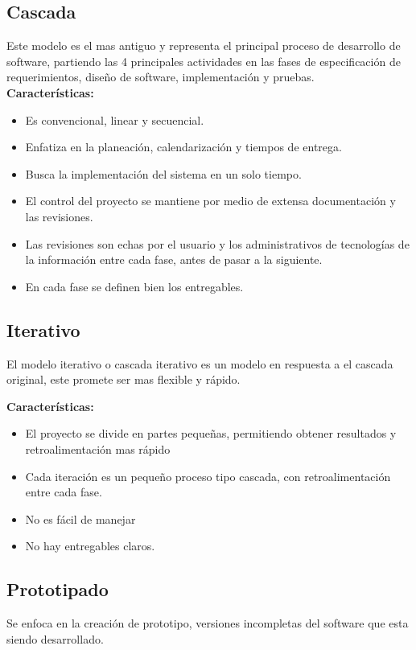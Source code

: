 \documentclass[spanish,12pt,letterpapper]{article}
\begin{document}
	\subsection{Cascada}
	Este modelo es el mas antiguo y representa el principal proceso de desarrollo de software, partiendo las 4 principales actividades en las fases de especificación de requerimientos, diseño de software, implementación y pruebas.\\ 
	
	\textbf{Características:}
	\begin{itemize}
	\item Es convencional, linear y secuencial.
	\item Enfatiza en la planeación, calendarización y tiempos de entrega.
	\item Busca la implementación del sistema en un solo tiempo.
	\item El control del proyecto se mantiene por medio de extensa documentación y las revisiones.
	\item Las revisiones son echas por el usuario y los administrativos de tecnologías de la información entre cada fase, antes de pasar a la siguiente.
	\item En cada fase se definen bien los entregables.
	\end{itemize}
	
	\subsection{Iterativo}
	El modelo iterativo o cascada iterativo es un modelo en respuesta a el cascada original, este promete ser mas flexible y rápido.
	
	\textbf{Características:}
	\begin{itemize}
	\item El proyecto se divide en partes pequeñas, permitiendo obtener resultados y retroalimentación mas rápido
	\item Cada iteración es un pequeño proceso tipo cascada, con retroalimentación entre cada fase.
	\item No es fácil de manejar
	\item No hay entregables claros.
	\end{itemize}
	
	\subsection{Prototipado}
	Se enfoca en la creación de prototipo, versiones incompletas del software que esta siendo desarrollado.
	
\end{document}
